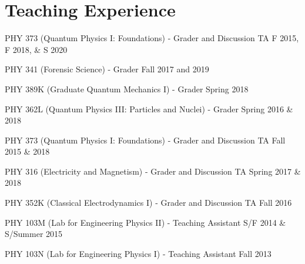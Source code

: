 \documentclass[letterpaper]{article}
\renewenvironment{itemize}{
  \begin{list}{}{
    \setlength{\leftmargin}{1.5em}
  }
}{
  \end{list}
}
\begin{document}
\section*{Teaching Experience}
\begin{itemize}

\item PHY 373 (Quantum Physics I: Foundations) - Grader and Discussion TA \hfill{F 2015, F 2018, \& S 2020}

\item PHY 341 (Forensic Science) - Grader \hfill Fall 2017 and 2019

\item PHY 389K (Graduate Quantum Mechanics I) - Grader \hfill{Spring 2018}

\item PHY 362L (Quantum Physics III: Particles and Nuclei) - Grader \hfill{Spring 2016 \& 2018}

\item PHY 373 (Quantum Physics I: Foundations) - Grader and Discussion TA \hfill{Fall 2015 \& 2018}

\item PHY 316 (Electricity and Magnetism) - Grader and Discussion TA \hfill Spring 2017 \& 2018

\item PHY 352K (Classical Electrodynamics I) - Grader and Discussion TA \hfill Fall 2016

\item PHY 103M (Lab for Engineering Physics II) - Teaching Assistant \hfill {S/F 2014 \& S/Summer 2015}

\item PHY 103N (Lab for Engineering Physics I) - Teaching Assistant \hfill {Fall 2013}

\end{itemize}
\end{document}

